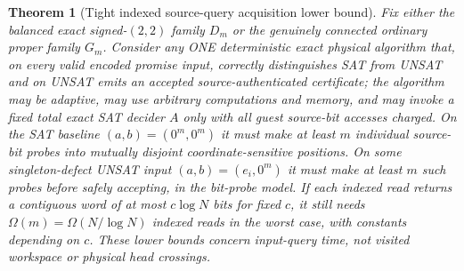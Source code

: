 \documentclass[11pt]{article}
\newtheorem{theorem}{Theorem}
\begin{document}
\begin{theorem}[Tight indexed source-query acquisition lower bound]\label{th:probe}
Fix either the balanced exact signed-$(2,2)$ family $D_m$ or the genuinely connected ordinary proper family $G_m$. Consider any ONE deterministic exact physical algorithm that, on every valid encoded promise input, correctly distinguishes SAT from UNSAT and on UNSAT emits an accepted source-authenticated certificate; the algorithm may be adaptive, may use arbitrary computations and memory, and may invoke a fixed total exact SAT decider $A$ \emph{only with all guest source-bit accesses charged}. On the SAT baseline $(a,b)=(0^m,0^m)$ it must make at least $m$ individual source-bit probes into mutually disjoint coordinate-sensitive positions. On some singleton-defect UNSAT input $(a,b)=(e_i,0^m)$ it must make at least $m$ such probes before safely accepting, in the bit-probe model. If each indexed read returns a contiguous word of at most $c\log N$ bits for fixed $c$, it still needs $\Omega(m)=\Omega(N/\log N)$ indexed reads in the worst case, with constants depending on $c$. These lower bounds concern input-query \emph{time}, not visited workspace or physical head crossings.
\end{theorem}
\end{document}
